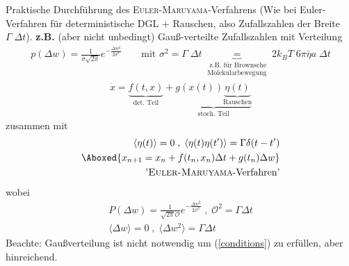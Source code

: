 \documentclass[12pt]{article}
\begin{document}
 Praktische Durchführung des \textsc{Euler-Maruyama}-Verfahrens  (Wie bei Euler-Verfahren für deterministische DGL $+$ Rauschen, also Zufallszahlen der Breite $\Gamma \; \Delta t$). \textbf{z.B.} (aber nicht unbedingt) Gauß-verteilte Zufallszahlen mit Verteilung 
 \begin{align*}
 p(\Delta w) = \frac{1}{\sigma \sqrt{2 \pi}} e^{- \frac{\Delta w^2}{2 \sigma ^2} } \qquad \text{mit } \sigma^2 = \Gamma \; \Delta t \underbrace{=}_{\substack{\text{ z.B. für Brownsche} \\ \text{Molekularbewegung}}} 2 k_B T \; 6 \pi \bar{\eta} a \; \Delta t
 \end{align*}
\begin{align}
\dot{x}= \underbrace{ f(t,x)}_\text{det. Teil} +\underbrace{ g(x(t)) \underbrace{\eta (t)}_\text{Rauschen}}_\text{stoch. Teil}
\end{align}
zusammen mit
\begin{align}
\langle \eta (t) \rangle = 0 \; , \; \langle \eta (t) \eta (t') \rangle = \Gamma \delta (t-t')  \label{conditions}\\
\Aboxed{ x_{n+1}= x_n + f(t_n, x_n) \Delta t + g (t_n) \Delta w}\\ 
\mbox{ \textsc{'Euler-Maruyama}-Verfahren'}
\end{align}
wobei 
\begin{align}
P( \Delta w) = \frac{1}{\sqrt{2 \pi} \mathcal{O}} e^{-\frac{\Delta w^2}{	2 \mathcal{O}^2}} \; , \; \mathcal{O}^2 = \Gamma \Delta t \\
\langle \Delta w \rangle = 0 \; , \; \langle \Delta w^2 \rangle = \Gamma \Delta t
\end{align}
Beachte: Gaußverteilung ist nicht notwendig um (\ref{conditions}) zu erfüllen, aber hinreichend. \\
\end{document}
